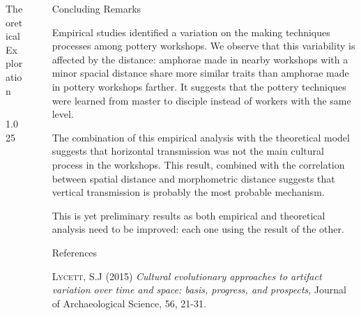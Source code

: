 \documentclass[final]{beamer}
\newlength{\sepwid}
\newlength{\onecolwid}
\newlength{\twocolwid}
\begin{document}
\begin{frame}[t]
\begin{columns}[t]
\begin{column}{\twocolwid}
\begin{block}{Theoretical Exploration}
\begin{columns}[t,totalwidth=\twocolwid]
\begin{column}{1.025\onecolwid}
    
\end{column}
\end{columns}

\end{block}
\end{column}


\begin{column}{\sepwid}\end{column} %

\begin{column}{\onecolwid} %

\begin{block}{Concluding Remarks}
\justify

Empirical studies identified a variation on the making techniques processes among pottery workshops. We observe that this variability is affected by the distance: amphorae made in nearby workshops with a minor spacial distance share more similar traits than amphorae made in pottery workshops farther. It suggests that the pottery techniques were learned from master to disciple instead of workers with the same level. 

The combination of this empirical analysis with the theoretical model suggests that horizontal transmission was not the main cultural process in the workshops. This result, combined with the correlation between spatial distance and morphometric distance suggests that vertical transmission is probably the most probable mechanism.

This is yet  preliminary results as both empirical and theoretical analysis need to be improved: each one using the result of the other. 

 
\end{block}

\begin{block}{References}
\small

\begin{thebibliography}{50}

\textsc{Lycett, S.J (2015)}
\textit{Cultural evolutionary approaches to artifact variation over time and space: basis, progress, and prospects}, Journal of Archaeological Science, 56, 21-31.


\end{thebibliography}
\end{block}
\end{column}
\end{columns}
\end{frame}
\end{document}
